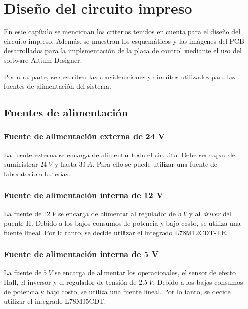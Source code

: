 \chapter{Diseño del circuito impreso}  \label{cap:PCB}

En este capítulo se mencionan los criterios tenidos en cuenta para el diseño del circuito impreso. Además, se muestran los esquemáticos y las imágenes del PCB desarrollados para la implementación de la placa de control mediante el uso del software Altium Designer. 

Por otra parte, se describen las consideraciones y circuitos utilizados para las fuentes de alimentación del sistema.



\section{Fuentes de alimentación}

\subsection{Fuente de alimentación externa de 24 V}

\noindent La fuente externa se encarga de alimentar todo el circuito. Debe ser capaz de suministrar $24\:V$ y hasta $30\:A$. Para ello se puede utilizar una fuente de laboratorio o baterías.

\subsection{Fuente de alimentación interna de 12 V}

\noindent La fuente de $12\:V$ se encarga de alimentar al regulador de $5\:V$ y al \textsl{driver} del puente H. Debido a los bajos consumos de potencia y bajo costo, se utiliza una fuente lineal. Por lo tanto, se decide utilizar el integrado L78M12CDT-TR.

\subsection{Fuente de alimentación interna de 5 V}

La fuente de $5\:V$ se encarga de alimentar los operacionales, el sensor de efecto Hall, el inversor y el regulador de tensión de $2.5\:V$. Debido a los bajos consumos de potencia y bajo costo, se utiliza una fuente lineal. Por lo tanto, se decide utilizar el integrado L78M05CDT.


